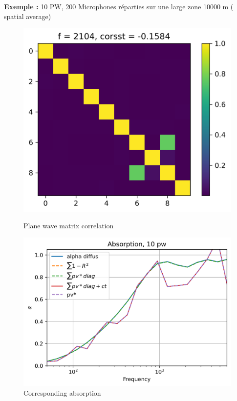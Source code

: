 \documentclass[
a4paper, %
12pt, %
]{SourcesTemplate/TemplateReport}
\begin{document}
\textbf{Exemple : }10 PW, 200 Microphones réparties sur une large zone 10000 m ( spatial average)\\

\begin{figure}[h!]
	\captionsetup{width=0.45\textwidth}
	\begin{minipage}[c]{.45\linewidth}
		\begin{center}
			\includegraphics[width=0.9\linewidth]{images/cross3}
			\caption*{Plane wave matrix correlation}
		\end{center}
	\end{minipage}
	\hfill
	\begin{minipage}[c]{.45\linewidth}
		\begin{center}
			\includegraphics[width=0.9\linewidth]{images/cross4}
			\caption*{Corresponding absorption}
		\end{center}
	\end{minipage}
\end{figure}	
	
\end{document}
